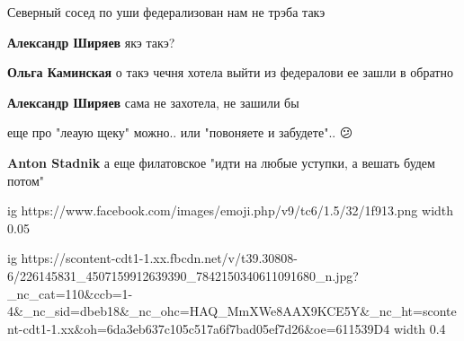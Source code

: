 Северный сосед по уши федерализован нам не трэба такэ

\begin{itemize}

 
\textbf{Александр Ширяев} якэ такэ?

 
\textbf{Ольга Каминская} о такэ чечня хотела выйти из федералови ее зашли в обратно

 
\textbf{Александр Ширяев} сама не захотела, не зашили бы
\end{itemize}


еще про "леаую щеку" можно..
или "повоняете и забудете".. 😕

\begin{itemize}

 
\textbf{Anton Stadnik} а еще филатовское "идти на любые уступки, а вешать будем потом"
\end{itemize}


\ifcmt
	ig https://www.facebook.com/images/emoji.php/v9/tc6/1.5/32/1f913.png
  width 0.05

  ig https://scontent-cdt1-1.xx.fbcdn.net/v/t39.30808-6/226145831_4507159912639390_7842150340611091680_n.jpg?_nc_cat=110&ccb=1-4&_nc_sid=dbeb18&_nc_ohc=HAQ_MmXWe8AAX9KCE5Y&_nc_ht=scontent-cdt1-1.xx&oh=6da3eb637c105c517a6f7bad05ef7d26&oe=611539D4
  width 0.4
\fi

 
